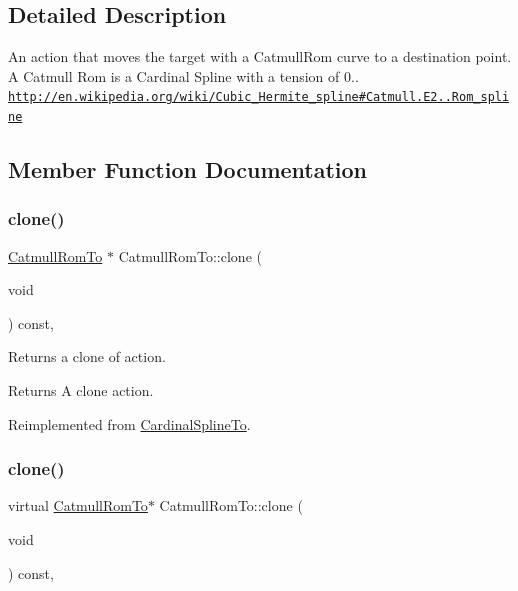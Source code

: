 \subsection{Detailed Description}
An action that moves the target with a Catmull\+Rom curve to a destination point. A Catmull Rom is a Cardinal Spline with a tension of 0.. \href{http://en.wikipedia.org/wiki/Cubic_Hermite_spline#Catmull.E2.80.93Rom_spline}{\tt http\+://en.\+wikipedia.\+org/wiki/\+Cubic\+\_\+\+Hermite\+\_\+spline\#\+Catmull.\+E2..\+Rom\+\_\+spline} 

\subsection{Member Function Documentation}
\mbox{\label{classCatmullRomTo_ac06c19763c7b07903f19178f94694541}} 
\subsubsection{\texorpdfstring{clone()}{clone()}\hspace{0.1cm}{\footnotesize\ttfamily [1/2]}}
{\footnotesize\ttfamily \hyperlink{classCatmullRomTo}{Catmull\+Rom\+To} $\ast$ Catmull\+Rom\+To\+::clone (\begin{DoxyParamCaption}\item[{void}]{ }\end{DoxyParamCaption}) const\hspace{0.3cm}{\ttfamily [override]}, {\ttfamily [virtual]}}

Returns a clone of action.

\begin{DoxyReturn}{Returns}
A clone action. 
\end{DoxyReturn}


Reimplemented from \hyperlink{classCardinalSplineTo_aed2a776edc3e26b2ba7524230edf42de}{Cardinal\+Spline\+To}.

\mbox{\label{classCatmullRomTo_afa8df104554278343334dfa497cc1526}} 
\subsubsection{\texorpdfstring{clone()}{clone()}\hspace{0.1cm}{\footnotesize\ttfamily [2/2]}}
{\footnotesize\ttfamily virtual \hyperlink{classCatmullRomTo}{Catmull\+Rom\+To}$\ast$ Catmull\+Rom\+To\+::clone (\begin{DoxyParamCaption}\item[{void}]{ }\end{DoxyParamCaption}) const\hspace{0.3cm}{\ttfamily [override]}, {\ttfamily [virtual]}}

